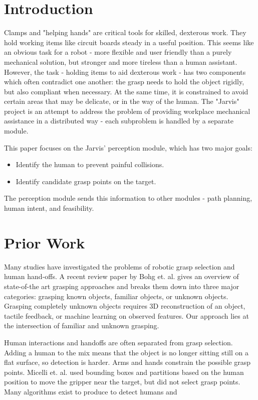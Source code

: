 \documentclass[10pt]{article}
\begin{document}
\section{Introduction} \label{sec:intro}
\par Clamps and "helping hands" are critical tools for skilled, dexterous work. They hold working items like circuit boards steady in a useful position. This seems like an obvious task for a robot - more flexible and user friendly than a purely mechanical solution, but stronger and more tireless than a human assistant. However, the task - holding items to aid dexterous work - has two components which often contradict one another: the grasp needs to hold the object rigidly, but also compliant when necessary. At the same time, it is constrained to avoid certain areas that may be delicate, or in the way of the human. The "Jarvis" project is an attempt to address the problem of providing workplace mechanical assistance in a distributed way - each subproblem is handled by a separate module. 

\par This paper focuses on the Jarvis' perception module, which has two major goals:
\begin{itemize}
\item Identify the human to prevent painful collisions.
\item Identify candidate grasp points on the target.
\end{itemize}

The perception module sends this information to other modules - path planning, human intent, and feasibility. 

\section{Prior Work} \label{sec:prior}

\par Many studies have investigated the problems of robotic grasp selection and human hand-offs. A recent review paper by Bohg et. al.\cite{Bohg2013} gives an overview of state-of-the art grasping approaches and breaks them down into three major categories: grasping known objects, familiar objects, or unknown objects. Grasping completely unknown objects requires 3D reconstruction of an object, tactile feedback,\cite{Hsiao2010} or machine learning on observed features.\cite{Lenz2013}\cite{Saxena}  Our approach lies at the intersection of familiar and unknown grasping.

\par Human interactions and handoffs are often separated from grasp selection. Adding a human to the mix means that the object is no longer sitting still on a flat surface, so detection is harder. Arms and hands constrain the possible grasp points. Micelli et. al. used bounding boxes and partitions based on the human position to move the gripper near the target, but did not select grasp points.\cite{Micelli2011} Many algorithms exist to produce to detect humans and 
\end{document}
